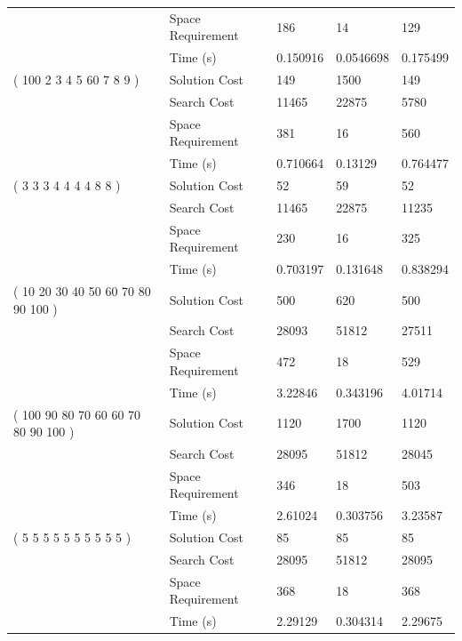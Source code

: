 \documentclass[12pt]{diazessay}
\begin{document}
\begin{tabular}{lllll}
                        & Space Requirement &        186 &         14 &        129 \\
                        & Time (s) &   0.150916 &  0.0546698 &   0.175499 \\
( 100 2 3 4 5 60 7 8 9 ) & Solution Cost &        149 &       1500 &        149 \\
                        & Search Cost &      11465 &      22875 &       5780 \\
                        & Space Requirement &        381 &         16 &        560 \\
                        & Time (s) &   0.710664 &    0.13129 &   0.764477 \\
( 3 3 3 4 4 4 4 8 8 ) & Solution Cost &         52 &         59 &         52 \\
                        & Search Cost &      11465 &      22875 &      11235 \\
                        & Space Requirement &        230 &         16 &        325 \\
                        & Time (s) &   0.703197 &   0.131648 &   0.838294 \\
( 10 20 30 40 50 60 70 80 90 100 ) & Solution Cost &        500 &        620 &        500 \\
                        & Search Cost &      28093 &      51812 &      27511 \\
                        & Space Requirement &        472 &         18 &        529 \\
                        & Time (s) &    3.22846 &   0.343196 &    4.01714 \\
( 100 90 80 70 60 60 70 80 90 100 ) & Solution Cost &       1120 &       1700 &       1120 \\
                        & Search Cost &      28095 &      51812 &      28045 \\
                        & Space Requirement &        346 &         18 &        503 \\
                        & Time (s) &    2.61024 &   0.303756 &    3.23587 \\
( 5 5 5 5 5 5 5 5 5 5 ) & Solution Cost &         85 &         85 &         85 \\
                        & Search Cost &      28095 &      51812 &      28095 \\
                        & Space Requirement &        368 &         18 &        368 \\
                        & Time (s) &    2.29129 &   0.304314 &    2.29675 \\
\bottomrule
\end{tabular}
\end{document}
